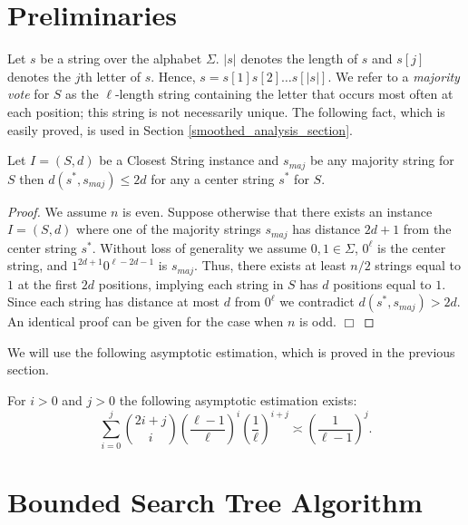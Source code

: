 \section{Preliminaries}

Let $s$ be a string over the alphabet $\Sigma$. $|s|$ denotes the length of $s$ and $s[j]$ denotes the $j$th letter of $s$.  Hence, $s = s[1]s[2]\ldots s[|s|]$.  We refer to a {\em majority vote} for $S$ as the $\ell$-length string containing the letter that occurs most often at each position; this string is not necessarily unique. The following fact, which is easily proved, is used in Section \ref{smoothed_analysis_section}.  

\begin{fact} \label{fact2} Let $I = (S, d)$ be a {\sc Closest String} instance and $s_{maj}$ be any majority string for $S$ then $d(s^*, s_{maj}) \leq 2d$ for any a center string $s^*$ for $S$.  \end{fact}

\begin{proof} We assume $n$ is even. Suppose otherwise that there exists an instance $I = (S, d)$ where one of the majority strings $s_{maj}$ has distance $2d + 1$ from the center string $s^*$.  Without loss of generality we assume $0, 1 \in \Sigma$, $0^{\ell}$ is the center string, and $1^{2d + 1}0^{\ell - 2d - 1}$ is $s_{maj}$.  Thus, there exists at least $n/2$ strings equal to $1$ at the first $2d$ positions, implying each string in $S$ has $d$ positions equal to $1$.   Since each string has distance at most $d$ from $0^{\ell}$ we contradict $d(s^*, s_{maj}) > 2d$.   An identical proof can be given for the case when $n$ is odd.  \hfill $\Box$ \end{proof} 

We will use the following asymptotic estimation, which is proved in the previous section.

 For $i > 0$ and $j > 0$ the following asymptotic estimation exists: $$\sum_{i = 0}^{j} {{2i + j}\choose{i}} \left( \frac{\ell - 1}{\ell}\right)^{i} \left( \frac{1}{\ell}\right)^{i + j} \asymp \left( \frac{1}{ \ell - 1}\right)^j.$$ 


\section{Bounded Search Tree Algorithm} \label{sec:search_tree_alg}

